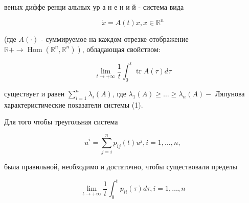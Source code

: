 \documentclass[10pt]{article}
\begin{document}
веных диффе ренци альных ур а н е н и й - система вида



\[

\dot{x}=A(t) x, x \in \mathbb{R}^{n}

\]



(где $A(\cdot)$ - суммируемое на каждом отрезке отображение $\left.\mathbb{R}+\rightarrow \operatorname{Hom}\left(\mathbb{R}^{n}, \mathbb{R}^{n}\right)\right)$, обладающая свойством:



\[

\lim _{t \rightarrow+\infty} \frac{1}{t} \int_{0}^{t} \operatorname{tr} A(\tau) d \tau

\]



существует и равен $\sum_{i=1}^{n} \lambda_{i}(A)$, где $\lambda_{1}(A) \geqslant \ldots \geqslant \lambda_{n}(A)-$ Ляпунова характеристические показатели системы (1).



Для того чтобы треугольная система



\[

\dot{u}^{i}=\sum_{j=i}^{n} p_{i j}(t) u^{j}, i=1, \ldots, n,

\]



была правильной, необходимо и достаточно, чтобы существовали пределы



\[

\lim _{t \rightarrow+\infty} \frac{1}{t} \int_{0}^{t} p_{i i}(\tau) d \tau, i=1, \ldots, n

\]
\end{document}
